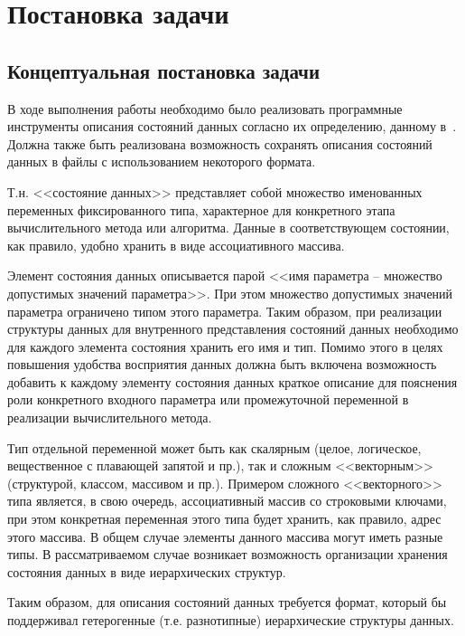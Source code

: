\chapter{Постановка задачи}
\section{Концептуальная постановка задачи}

В ходе выполнения работы необходимо было реализовать программные инструменты описания состояний данных согласно их определению, данному в~\cite{SokolovPershin2018}. Должна также быть реализована возможность сохранять описания состояний данных в файлы с использованием некоторого формата.


Т.н. <<состояние данных>>\cite{SokolovPershin2018} представляет собой множество именованных переменных фиксированного типа, характерное для конкретного этапа вычислительного метода или алгоритма. Данные в соответствующем состоянии, как правило, удобно хранить в виде ассоциативного массива.

Элемент состояния данных описывается парой <<имя параметра -- множество допустимых значений параметра>>\cite{SokolovPershin2018}. При этом множество допустимых значений параметра ограничено типом этого параметра. Таким образом, при реализации структуры данных для внутренного представления состояний данных необходимо для каждого элемента состояния хранить его имя и тип. Помимо этого в целях повышения удобства восприятия данных должна быть включена возможность добавить к каждому элементу состояния данных краткое описание для пояснения роли конкретного входного параметра или промежуточной переменной в реализации вычислительного метода.

Тип отдельной переменной может быть как скалярным (целое, логическое, вещественное с плавающей запятой и пр.), так и сложным <<векторным>> (структурой, классом, массивом и пр.). Примером сложного <<векторного>> типа является, в свою очередь, ассоциативный массив со строковыми ключами, при этом конкретная переменная этого типа будет хранить, как правило, адрес этого массива. В общем случае элементы данного массива могут иметь разные типы. В рассматриваемом случае возникает возможность организации хранения состояния данных в виде иерархических структур.

Таким образом, для описания состояний данных требуется формат, который бы поддерживал гетерогенные (т.е. разнотипные) иерархические структуры данных.


